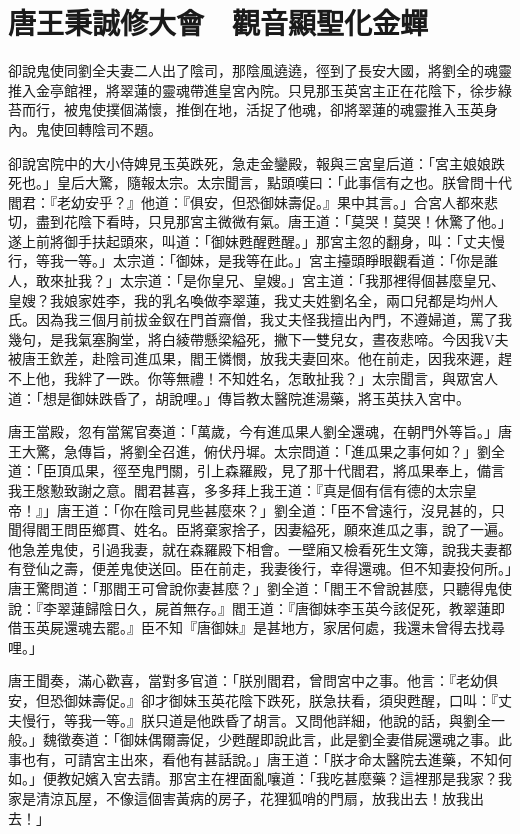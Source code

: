 
\chapter{唐王秉誠修大會　觀音顯聖化金蟬}

卻說鬼使同劉全夫妻二人出了陰司，那陰風遶遶，徑到了長安大國，將劉全的魂靈推入金亭館裡，將翠蓮的靈魂帶進皇宮內院。只見那玉英宮主正在花陰下，徐步綠苔而行，被鬼使撲個滿懷，推倒在地，活捉了他魂，卻將翠蓮的魂靈推入玉英身內。鬼使回轉陰司不題。

卻說宮院中的大小侍婢見玉英跌死，急走金鑾殿，報與三宮皇后道：「宮主娘娘跌死也。」皇后大驚，隨報太宗。太宗聞言，點頭嘆曰：「此事信有之也。朕曾問十代閻君：『老幼安乎？』他道：『俱安，但恐御妹壽促。』果中其言。」合宮人都來悲切，盡到花陰下看時，只見那宮主微微有氣。唐王道：「莫哭！莫哭！休驚了他。」遂上前將御手扶起頭來，叫道：「御妹甦醒甦醒。」那宮主忽的翻身，叫：「丈夫慢行，等我一等。」太宗道：「御妹，是我等在此。」宮主擡頭睜眼觀看道：「你是誰人，敢來扯我？」太宗道：「是你皇兄、皇嫂。」宮主道：「我那裡得個甚麼皇兄、皇嫂？我娘家姓李，我的乳名喚做李翠蓮，我丈夫姓劉名全，兩口兒都是均州人氏。因為我三個月前拔金釵在門首齋僧，我丈夫怪我擅出內門，不遵婦道，罵了我幾句，是我氣塞胸堂，將白綾帶懸梁縊死，撇下一雙兒女，晝夜悲啼。今因我V夫被唐王欽差，赴陰司進瓜果，閻王憐憫，放我夫妻回來。他在前走，因我來遲，趕不上他，我絆了一跌。你等無禮！不知姓名，怎敢扯我？」太宗聞言，與眾宮人道：「想是御妹跌昏了，胡說哩。」傳旨教太醫院進湯藥，將玉英扶入宮中。

唐王當殿，忽有當駕官奏道：「萬歲，今有進瓜果人劉全還魂，在朝門外等旨。」唐王大驚，急傳旨，將劉全召進，俯伏丹墀。太宗問道：「進瓜果之事何如？」劉全道：「臣頂瓜果，徑至鬼門關，引上森羅殿，見了那十代閻君，將瓜果奉上，備言我王慇懃致謝之意。閻君甚喜，多多拜上我王道：『真是個有信有德的太宗皇帝！』」唐王道：「你在陰司見些甚麼來？」劉全道：「臣不曾遠行，沒見甚的，只聞得閻王問臣鄉貫、姓名。臣將棄家捨子，因妻縊死，願來進瓜之事，說了一遍。他急差鬼使，引過我妻，就在森羅殿下相會。一壁廂又檢看死生文簿，說我夫妻都有登仙之壽，便差鬼使送回。臣在前走，我妻後行，幸得還魂。但不知妻投何所。」唐王驚問道：「那閻王可曾說你妻甚麼？」劉全道：「閻王不曾說甚麼，只聽得鬼使說：『李翠蓮歸陰日久，屍首無存。』閻王道：『唐御妹李玉英今該促死，教翠蓮即借玉英屍還魂去罷。』臣不知『唐御妹』是甚地方，家居何處，我還未曾得去找尋哩。」

唐王聞奏，滿心歡喜，當對多官道：「朕別閻君，曾問宮中之事。他言：『老幼俱安，但恐御妹壽促。』卻才御妹玉英花陰下跌死，朕急扶看，須臾甦醒，口叫：『丈夫慢行，等我一等。』朕只道是他跌昏了胡言。又問他詳細，他說的話，與劉全一般。」魏徵奏道：「御妹偶爾壽促，少甦醒即說此言，此是劉全妻借屍還魂之事。此事也有，可請宮主出來，看他有甚話說。」唐王道：「朕才命太醫院去進藥，不知何如。」便教妃嬪入宮去請。那宮主在裡面亂嚷道：「我吃甚麼藥？這裡那是我家？我家是清涼瓦屋，不像這個害黃病的房子，花狸狐哨的門扇，放我出去！放我出去！」

